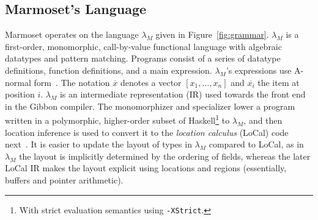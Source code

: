 \documentclass[acmsmall,review,anonymous]{acmart}\settopmatter{printfolios=true,printccs=false,printacmref=false}
\newcommand{\figref}[1]{Figure~\ref{#1}\xspace}
\newcommand{\il}[1]{\lstinline[style=inline,mathescape=true];#1;}
\newcommand{\system}{{\sc Marmoset}\xspace}
\newcommand{\systemlang}[0]{\ensuremath{\lambda_{M}}}
\newcommand{\keywd}[1]{\mathit{#1}}
\newcommand{\ind}{\keywd{i}}
\newcommand{\vectorize}[1]{\overline{#1}}
\providecommand{\DIFaddtex}[1]{{\protect\color{blue} \sf #1}} %
\providecommand{\DIFaddbegin}{} %
\providecommand{\DIFaddend}{} %
\providecommand{\DIFadd}[1]{\texorpdfstring{\DIFaddtex{#1}}{#1}} %
\newcommand{\DIFaddincludegraphics}[2][]{{\color{blue}\fbox{\DIFOincludegraphics[#1]{#2}}}} %
\DeclareRobustCommand{\DIFaddbegin}{\DIFOaddbegin \let\includegraphics\DIFaddincludegraphics} %
\DeclareRobustCommand{\DIFaddend}{\DIFOaddend \let\includegraphics\DIFOincludegraphics} %
\begin{document}
\subsection{\system's Language}
\system{} operates on the language \systemlang{} given in \figref{fig:grammar}.
\systemlang{} is a first-order, monomorphic, call-by-value functional language
with algebraic datatypes and pattern matching.
Programs consist of a series of datatype definitions, function definitions, and a main expression.
\systemlang{}'s expressions use A-normal form~\cite{ANF}.
The notation $\vectorize{x}$ denotes a vector $ [x_1, \ldots, x_n] $ and $\vectorize{x_{\ind}}$
the item at position $\ind$.
\systemlang{} is an intermediate representation (IR) used towards the front end in the Gibbon compiler.
The monomorphizer and specializer lower a program written in \DIFaddbegin \DIFadd{a }\DIFaddend polymorphic, higher-order subset of Haskell\footnote{With strict evaluation semantics using \il{-XStrict}.} to \systemlang{},
and then location inference is used to convert it to the {\em location calculus} (LoCal) code next~\cite{Local}.
It is easier to update the layout of types in \systemlang{} compared to LoCal,
as in \systemlang{} the layout is implicitly determined by the ordering of fields,
whereas the later LoCal IR makes the layout explicit using locations and regions (essentially, buffers and pointer arithmetic).











	
\end{document}
